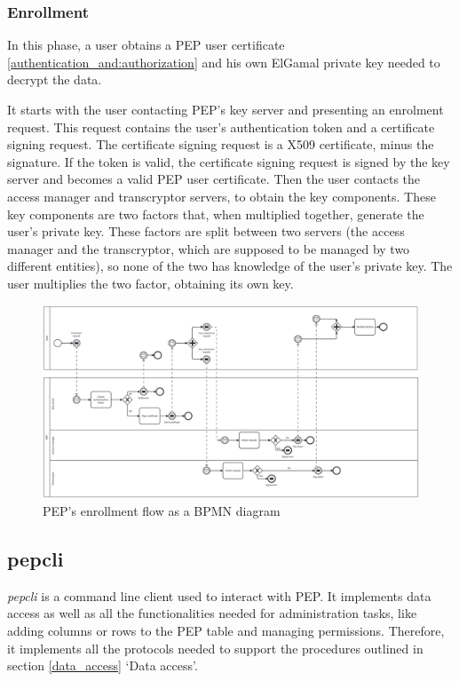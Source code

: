 \documentclass{report}
\begin{document}
\subsubsection{Enrollment}
In this phase, a user obtains a PEP user certificate \ref{authentication_and:authorization} and his own ElGamal private key needed to decrypt the data. \par
It starts with the user contacting PEP's key server and presenting an enrolment request. This request contains the user's authentication token and a certificate signing request.
The certificate signing request is a X509 certificate, minus the signature. If the token is valid, the certificate signing request is signed by the key server and becomes a valid
PEP user certificate. Then the user contacts the access manager and transcryptor servers, to obtain the key components. These key components are two factors that, when multiplied 
together, generate the user's private key. These factors are split between two servers (the access manager and the transcryptor, which are supposed to be managed by two different
entities), so none of the two has knowledge of the user's private key. The user multiplies the two factor, obtaining its own key.

\begin{figure}[H]
	\includegraphics[scale=0.1, angle=-90]{enrollment}
	\caption{PEP's enrollment flow as a BPMN diagram}
	\label{bpmn-enrollment-flow}
\end{figure}

\subsection{pepcli}\label{pepcli}
\textit{pepcli} is a command line client used to interact with PEP. It implements data access as well as all the functionalities needed for administration tasks, like adding
columns or rows to the PEP table and managing permissions. Therefore, it implements all the protocols needed to support the procedures outlined in section \ref{data_access} \enquote*{Data access}.
\end{document}
